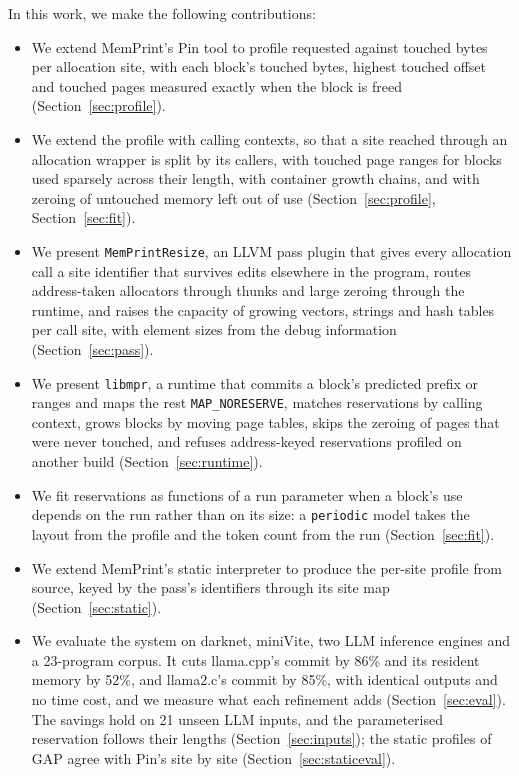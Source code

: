 \documentclass[11pt]{article}
\newcommand{\memprint}{MemPrint}
\newcommand{\libmpr}{\texttt{libmpr}}
\newcommand{\pass}{\texttt{MemPrintResize}}
\newcommand{\secref}[1]{Section~\ref{#1}}
\begin{document}
In this work, we make the following contributions:
\begin{itemize}
  \item We extend \memprint{}'s Pin tool to profile requested against touched bytes per allocation site, with
  each block's touched bytes, highest touched offset and touched pages measured exactly when the block is
  freed (\secref{sec:profile}).
  \item We extend the profile with calling contexts, so that a site reached through an allocation wrapper is
  split by its callers, with touched page ranges for blocks used sparsely across their length, with container
  growth chains, and with zeroing of untouched memory left out of use (\secref{sec:profile},
  \secref{sec:fit}).
  \item We present \pass{}, an LLVM pass plugin that gives every allocation call a site identifier that survives
  edits elsewhere in the program, routes address-taken allocators through thunks and large zeroing through the
  runtime, and raises the capacity of growing vectors, strings and hash tables per call site, with element sizes
  from the debug information (\secref{sec:pass}).
  \item We present \libmpr{}, a runtime that commits a block's predicted prefix or ranges and maps the rest
  \texttt{MAP\_NORESERVE}, matches reservations by calling context, grows blocks by moving page tables, skips the
  zeroing of pages that were never touched, and refuses address-keyed reservations profiled on another build
  (\secref{sec:runtime}).
  \item We fit reservations as functions of a run parameter when a block's use depends on the run rather than on
  its size: a \texttt{periodic} model takes the layout from the profile and the token count from the run
  (\secref{sec:fit}).
  \item We extend \memprint{}'s static interpreter to produce the per-site profile from source, keyed by the
  pass's identifiers through its site map (\secref{sec:static}).
  \item We evaluate the system on darknet, miniVite, two LLM inference engines and a 23-program corpus. It cuts
  llama.cpp's commit by 86\% and its resident memory by 52\%, and llama2.c's commit by 85\%, with identical
  outputs and no time cost, and we measure what each refinement adds (\secref{sec:eval}). The savings hold on
  21 unseen LLM inputs, and the parameterised reservation follows their lengths (\secref{sec:inputs}); the
  static profiles of GAP agree with Pin's site by site (\secref{sec:staticeval}).

\end{itemize}
\end{document}
